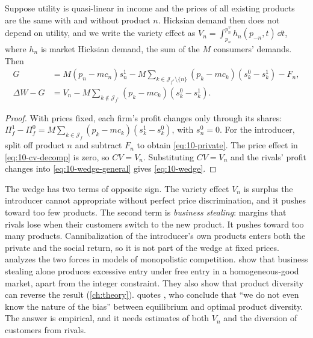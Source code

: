 \begin{proposition}\label{prop:10-wedge}
Suppose utility is quasi-linear in income and the prices of all existing products are the same with and
without product $n$. Hicksian demand then does not depend on utility, and we write the variety effect as
$V_n = \int_{p_n}^{p_n^V}h_n(p_{-n},t)\,\dd t$, where $h_n$ is market Hicksian demand, the sum of the $M$
consumers' demands. Then
\begin{align}
  G &= M(p_n - mc_n)s_n^1 - M\sum_{k\in\mathcal{J}_{f^*}\setminus\{n\}}(p_k - mc_k)(s_k^0 - s_k^1) - F_n,
  \label{eq:10-private}\\
  \Delta W - G &= V_n - M\sum_{k\notin\mathcal{J}_{f^*}}(p_k - mc_k)(s_k^0 - s_k^1). \label{eq:10-wedge}
\end{align}
\end{proposition}

\begin{proof}
With prices fixed, each firm's profit changes only through its shares:
$\Pi_f^1 - \Pi_f^0 = M\sum_{k\in\mathcal{J}_f}(p_k - mc_k)(s_k^1 - s_k^0)$, with $s_n^0 = 0$. For the
introducer, split off product $n$ and subtract $F_n$ to obtain \eqref{eq:10-private}. The price effect in
\eqref{eq:10-cv-decomp} is zero, so $CV = V_n$. Substituting $CV = V_n$ and the rivals' profit changes into
\eqref{eq:10-wedge-general} gives \eqref{eq:10-wedge}.
\end{proof}

The wedge has two terms of opposite sign. The variety effect $V_n$ is surplus the introducer cannot
appropriate without perfect price discrimination, and it pushes toward too few products. The second term is
\emph{business stealing}: margins that rivals lose when their customers switch to the new product. It pushes
toward too many products. Cannibalization of the introducer's own products enters both the private and the
social return, so it is not part of the wedge at fixed prices. \citet{Spence1976} analyzes the two forces in
models of monopolistic competition. \citet{MankiwWhinston1986} show that business stealing alone produces
excessive entry under free entry in a homogeneous-good market, apart from the integer constraint. They also
show that product diversity can reverse the result (\cref{ch:theory}). \citet[p.~237, n.~1]{Bresnahan1997} quotes
\citet{EatonLipsey1989}, who conclude that ``we do not even know the nature of the bias'' between equilibrium
and optimal product diversity. The answer is empirical, and it needs estimates of both $V_n$ and the
diversion of customers from rivals.


